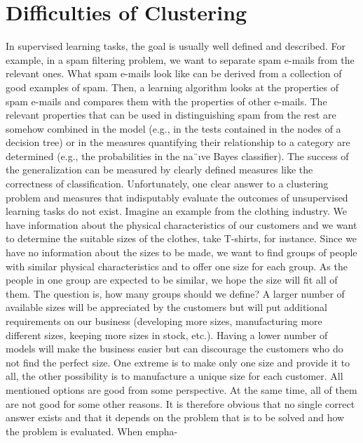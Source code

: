 \documentclass[11pt,openany,executivepaper]{book}
\begin{document}
\section{Difficulties of Clustering}

In supervised learning tasks, the goal is usually well defined and described. For
example, in a spam filtering problem, we want to separate spam e-mails from
the relevant ones. What spam e-mails look like can be derived from a collection of good examples of spam. Then, a learning algorithm looks at the properties of spam e-mails and compares them with the properties of other e-mails.
The relevant properties that can be used in distinguishing spam from the rest are
somehow combined in the model (e.g., in the tests contained in the nodes of a
decision tree) or in the measures quantifying their relationship to a category are
determined (e.g., the probabilities in the na¨ıve Bayes classifier). The success of
the generalization can be measured by clearly defined measures like the correctness of classification. Unfortunately, one clear answer to a clustering problem
and measures that indisputably evaluate the outcomes of unsupervised learning
tasks do not exist.
Imagine an example from the clothing industry. We have information about
the physical characteristics of our customers and we want to determine the suitable sizes of the clothes, take T-shirts, for instance. Since we have no information
about the sizes to be made, we want to find groups of people with similar physical
characteristics and to offer one size for each group. As the people in one group
are expected to be similar, we hope the size will fit all of them. The question is,
how many groups should we define? A larger number of available sizes will be
appreciated by the customers but will put additional requirements on our business
(developing more sizes, manufacturing more different sizes, keeping more sizes
in stock, etc.). Having a lower number of models will make the business easier
but can discourage the customers who do not find the perfect size. One extreme
is to make only one size and provide it to all, the other possibility is to manufacture a unique size for each customer. All mentioned options are good from some
perspective. At the same time, all of them are not good for some other reasons.
It is therefore obvious that no single correct answer exists and that it depends on
the problem that is to be solved and how the problem is evaluated. When empha-
\end{document}
